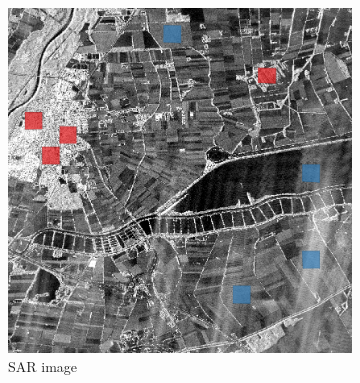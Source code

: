 \documentclass[
  lettersize  journal,
]{IEEEtran}%
\providecommand{\DIFaddtex}[1]{{\protect\color{blue}\uwave{#1}}} %
\providecommand{\DIFaddFL}[1]{\DIFadd{#1}} %
\providecommand{\DIFaddbeginFL}{} %
\providecommand{\DIFaddendFL}{} %
\providecommand{\DIFdelbeginFL}{} %
\providecommand{\DIFdelendFL}{} %
\providecommand{\DIFadd}[1]{\texorpdfstring{\DIFaddtex{#1}}{#1}} %
\newcommand{\DIFscaledelfig}{0.5}
\newlength{\DIFdelgraphicswidth} %
\newlength{\DIFdelgraphicsheight} %
\newcommand{\DIFaddincludegraphics}[2][]{{\color{blue}\fbox{\DIFOincludegraphics[#1]{#2}}}} %
\newcommand{\DIFdelincludegraphics}[2][]{%
\sbox{\DIFdelgraphicsbox}{\DIFOincludegraphics[#1]{#2}}%
\settoboxwidth{\DIFdelgraphicswidth}{\DIFdelgraphicsbox} %
\settoboxtotalheight{\DIFdelgraphicsheight}{\DIFdelgraphicsbox} %
\scalebox{\DIFscaledelfig}{%
\parbox[b]{\DIFdelgraphicswidth}{\usebox{\DIFdelgraphicsbox}\\[-\baselineskip] \rule{\DIFdelgraphicswidth}{0em}}\llap{\resizebox{\DIFdelgraphicswidth}{\DIFdelgraphicsheight}{%
\setlength{\unitlength}{\DIFdelgraphicswidth}%
\begin{picture}(1,1)%
\thicklines\linethickness{2pt} %
{\color[rgb]{1,0,0}\put(0,0){\framebox(1,1){}}}%
{\color[rgb]{1,0,0}\put(0,0){\line( 1,1){1}}}%
{\color[rgb]{1,0,0}\put(0,1){\line(1,-1){1}}}%
\end{picture}%
}\hspace*{3pt}}} %
} %
\DeclareRobustCommand{\DIFaddbeginFL}{\DIFOaddbeginFL \let\includegraphics\DIFaddincludegraphics} %
\DeclareRobustCommand{\DIFaddendFL}{\DIFOaddendFL \let\includegraphics\DIFOincludegraphics} %
\DeclareRobustCommand{\DIFdelbeginFL}{\DIFOdelbeginFL \let\includegraphics\DIFdelincludegraphics} %
\DeclareRobustCommand{\DIFdelendFL}{\DIFOaddendFL \let\includegraphics\DIFOincludegraphics} %
\begin{document}
\begin{figure}[hbt]
    \centering
        \DIFdelbeginFL %
\DIFdelendFL \DIFaddbeginFL \begin{subfigure}{0.145\textwidth}
        \includegraphics[width=\linewidth]{./Figures-R1/munich_roi.png}
        \DIFaddendFL \caption{SAR image}
        \DIFdelbeginFL %
\DIFdelendFL \DIFaddbeginFL \label{fig:munich-sar}
    \DIFaddendFL \end{subfigure}
    \DIFdelbeginFL %
\DIFdelendFL \DIFaddbeginFL \DIFaddFL{\hspace{0.00001\textwidth}
  }\begin{subfigure}{0.137\textwidth}

\end{subfigure}
\end{figure}
\end{document}
